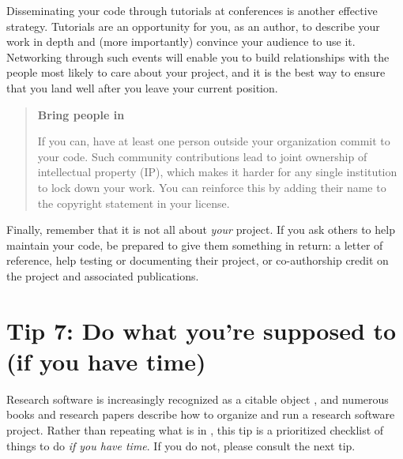 \documentclass[10pt,letterpaper]{article}
\begin{document}
Disseminating your code through tutorials at conferences is another effective strategy.
Tutorials are an opportunity for you,
as an author,
to describe your work in depth
and (more importantly) convince your audience to use it.
Networking through such events will enable you to build relationships with
the people most likely to care about your project,
and it is the best way to ensure that you land well after you leave your current position.

\begin{quote}
  \noindent
  \textbf{Bring people in}

  If you can, have at least one person outside your organization commit to your code.
  Such community contributions lead to joint ownership of intellectual property (IP),
  which makes it harder for any single institution to lock down your work.
  You can reinforce this by adding their name to the copyright statement in your license.
\end{quote}

Finally,
remember that it is not all about \emph{your} project.
If you ask others to help maintain your code,
be prepared to give them something in return:
a letter of reference,
help testing or documenting their project,
or co-authorship credit on the project and associated publications.

\section*{Tip 7: Do what you're supposed to (if you have time)}

Research software is increasingly recognized as a citable object \cite{Smith2016,Katz2021,Garijo2024},
and numerous books and research papers describe how to organize and run a research software project.
Rather than repeating what is in
\cite{Sandve2013,Wilson2014,Lee2018a,Dryden2019,Akhmerov2020,Chue2021,Lees2022,Druskat2023,Akhmerov2023,Kumar2023,Struck2023,Reina2024},
this tip is a prioritized checklist of things to do
\emph{if you have time}.
If you do not,
please consult the next tip.
\end{document}
